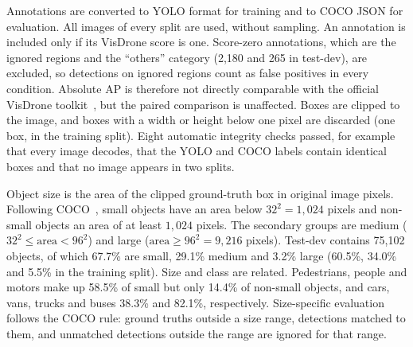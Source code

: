\documentclass[conference]{IEEEtran}
\begin{document}
Annotations are converted to YOLO format for training and to COCO JSON for evaluation. All images
of every split are used, without sampling. An annotation is included only if its VisDrone score
is one. Score-zero annotations, which are the ignored regions and the ``others'' category (2,180
and 265 in test-dev), are excluded, so detections on ignored regions count as false positives in
every condition. Absolute AP is therefore not directly comparable with the official VisDrone
toolkit~\cite{cao2021visdrone}, but the paired comparison is unaffected. Boxes are clipped to the
image, and boxes with a width or height below one pixel are discarded (one box, in the training
split). Eight automatic integrity checks passed, for example that every image decodes, that the
YOLO and COCO labels contain identical boxes and that no image appears in two splits.

Object size is the area of the clipped ground-truth box in original image pixels. Following
COCO~\cite{lin2014coco}, small objects have an area below $32^2=1{,}024$ pixels and non-small
objects an area of at least $1{,}024$ pixels. The secondary groups are medium
($32^2 \leq \mathrm{area} < 96^2$) and large ($\mathrm{area} \geq 96^2=9{,}216$ pixels). Test-dev
contains 75,102 objects, of which 67.7\% are small, 29.1\% medium and 3.2\% large (60.5\%, 34.0\%
and 5.5\% in the training split). Size and class are related. Pedestrians, people and motors make
up 58.5\% of small but only 14.4\% of non-small objects, and cars, vans, trucks and buses 38.3\%
and 82.1\%, respectively. Size-specific evaluation follows the COCO rule: ground truths outside a
size range, detections matched to them, and unmatched detections outside the range are ignored
for that range.
\end{document}
